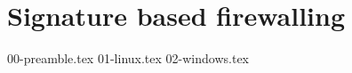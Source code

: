 \chapter{Signature based firewalling}
\label{sign:chapter}

{00-preamble.tex}
{01-linux.tex}
{02-windows.tex}


